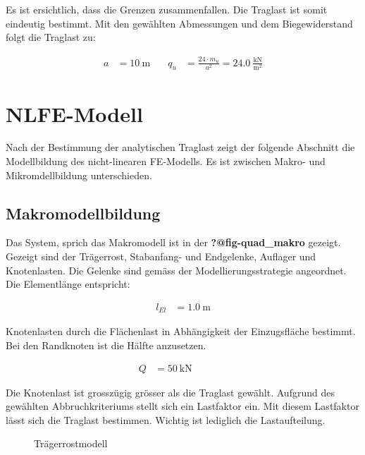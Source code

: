 \documentclass[
  11pt,
  letterpaper,
]{scrreprt}
\makeatletter
\newcommand*\pandocbounded[1]{%
  \sbox\pandoc@box{#1}%
  \Gscale@div\@tempa{\textheight}{\dimexpr\ht\pandoc@box+\dp\pandoc@box\relax}%
  \Gscale@div\@tempb{\linewidth}{\wd\pandoc@box}%
  \ifdim\@tempb\p@<\@tempa\p@\let\@tempa\@tempb\fi%
  \ifdim\@tempa\p@<\p@\scalebox{\@tempa}{\usebox\pandoc@box}%
  \else\usebox{\pandoc@box}%
  \fi%
}
\makeatother
\begin{document}
Es ist ersichtlich, dass die Grenzen zusammenfallen. Die Traglast ist
somit eindeutig bestimmt. Mit den gewählten Abmessungen und dem
Biegewiderstand folgt die Traglast zu:

\[
\begin{aligned}
a& = 10 \ \mathrm{m} \quad & q_{u}& = \frac{24 \cdot m_{u}}{a^{2}} = 24.0 \ \frac{\mathrm{kN}}{\mathrm{m}^{2}} \end{aligned}
\]

\section{NLFE-Modell}\label{nlfe-modell-2}

Nach der Bestimmung der analytischen Traglast zeigt der folgende
Abschnitt die Modellbildung des nicht-linearen FE-Modells. Es ist
zwischen Makro- und Mikromdellbildung unterschieden.

\subsection{Makromodellbildung}\label{makromodellbildung-1}

Das System, sprich das Makromodell ist in der \textbf{?@fig-quad\_makro}
gezeigt. Gezeigt sind der Trägerrost, Stabanfang- und Endgelenke,
Auflager und Knotenlasten. Die Gelenke sind gemäss der
Modellierungsstrategie angeordnet. Die Elementlänge entspricht:

\[
\begin{aligned}
l_{El}& = 1.0 \ \mathrm{m} \end{aligned}
\]

Knotenlasten durch die Flächenlast in Abhängigkeit der Einzugsfläche
bestimmt. Bei den Randknoten ist die Hälfte anzusetzen.

\[
\begin{aligned}
Q& = 50 \ \mathrm{kN} \quad &  \quad &  
 \end{aligned}
\]

Die Knotenlast ist grosszügig grösser als die Traglast gewählt. Aufgrund
des gewählten Abbruchkriteriums stellt sich ein Lastfaktor ein. Mit
diesem Lastfaktor lässt sich die Traglast bestimmen. Wichtig ist
lediglich die Lastaufteilung.

\begin{figure}[H]

\centering{

\pandocbounded{}

}

\caption{\label{fig-quad_system}Trägerrostmodell}

\end{figure}%
\end{document}
